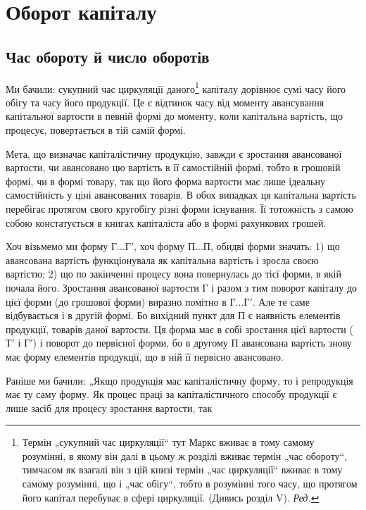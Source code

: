 
\chapter{Оборот капіталу}

\section{Час обороту й число оборотів}

\label{original-104}
Ми бачили: сукупний час циркуляції даного\footnote*{
Термін „сукупний час циркуляції“ тут Маркс вживає в тому самому розумінні,
в якому він далі в цьому ж розділі вживає термін „час обороту“, тимчасом
як взагалі він з цій книзі термін „час циркуляції“ вживає в тому самому
розумінні, що і „час обігу“, тобто в розумінні того часу, що протягом його капітал
перебуває в сфері циркуляції. (Дивись розділ V). \emph{Ред.}
} капіталу дорівнює сумі
часу його обігу та часу його продукції. Це є відтинок часу від моменту
авансування капітальної вартости в певній формі до моменту, коли капітальна
вартість, що процесує, повертається в тій самій формі.

Мета, що визначає капіталістичну продукцію, завжди є зростання
авансованої вартости, чи авансовано цю вартість в її самостійній формі,
тобто в грошовій формі, чи в формі товару, так що його форма вартости
має лише ідеальну самостійність у ціні авансованих товарів.
В обох випадках ця капітальна вартість перебігає протягом свого кругобігу
різні форми існування. Її тотожність з самою собою констатується
в книгах капіталіста або в формі рахункових грошей.

Хоч візьмемо ми форму $Г\dots{} Г'$, хоч форму $П\dots{} П$, обидві форми
значать: 1) що авансована вартість функціонувала як капітальна вартість
і зросла своєю вартістю; 2) що по закінченні процесу вона повернулась
до тієї форми, в якій почала його. Зростання авансованої вартости $Г$ і
разом з тим поворот капіталу до цієї форми (до грошової форми) виразно
помітно в $Г\dots{} Г'$. Але те саме відбувається і в другій формі. Бо
вихідний пункт для $П$ є наявність елементів продукції, товарів даної
вартости. Ця форма має в собі зростання цієї вартости ($Т'$ і $Г'$) і поворот
до первісної форми, бо в другому $П$ авансована вартість
знову має форму елементів продукції, що в ній її первісно авансовано.

Раніше ми бачили: „Якщо продукція має капіталістичну форму, то
і репродукція має ту саму форму. Як процес праці за капіталістичного
способу продукції є лише засіб для процесу зростання вартости, так
\parbreak{}  %
